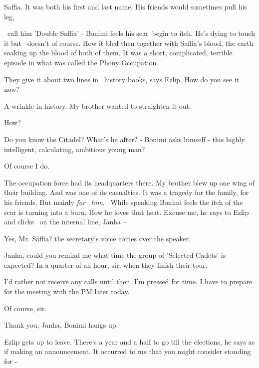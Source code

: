 \documentclass[letterpaper]{article}
\begin{document}
{\textquotedbl}Saffia. It was both his first and last name. His friends would sometimes pull his leg, 

\ call him 'Double Saffia' -{\textquotedbl} Bonimi feels his scar~begin to itch. He's dying to touch it but \ doesn't of
course. How it bled then together with Saffia's blood, the earth soaking up the blood of both of them.
{\textquotedbl}It was a short, complicated, terrible episode in what was called the Phony Occupation.{\textquotedbl} 

{\textquotedbl}They give it about two lines in \ history books,{\textquotedbl} says Ezlip. {\textquotedbl}How do you see
it now?{\textquotedbl} 

{\textquotedbl}A wrinkle in history. My brother wanted to straighten it out.{\textquotedbl} 

{\textquotedbl}How?{\textquotedbl} 

{\textquotedbl}Do you know the Citadel?{\textquotedbl} What's he after? - Bonimi asks himself - this highly intelligent,
calculating, ambitious young man? 

{\textquotedbl}Of course I do.{\textquotedbl} 

{\textquotedbl}The occupation force had its headquarters there. My brother blew up one wing of their building. And was
one of its casualties. It was a tragedy for the family, for his friends. But mainly \textit{for \ him}.{\textquotedbl}
\ While speaking Bonimi feels the itch of the scar is turning into a burn. How he loves that heat.
{\textquotedbl}Excuse me,{\textquotedbl} he says to Ezlip and clicks \ on the internal line, {\textquotedbl}Janha --
{\textquotedbl} 

{\textquotedbl}Yes, Mr. Saffia?{\textquotedbl} the secretary's voice comes over the speaker.

{\textquotedbl}Janha, could you remind me what time the group of 'Selected Cadets'{ }is
expected?{\textquotedbl} {\textquotedbl}In a quarter of an hour, sir, when they finish their tour.{\textquotedbl} 

{\textquotedbl}I'd rather not receive any calls until then. I'm pressed for time. I have to prepare for the meeting with
the PM later today.{\textquotedbl} 

{\textquotedbl}Of course, sir.{\textquotedbl} 

{\textquotedbl}Thank you, Janha,{\textquotedbl} Bonimi hangs up. 

Ezlip gets up to leave. {\textquotedbl}There's a year and a half to go till the elections,{\textquotedbl} he says as if
making an announcement. {\textquotedbl}It occurred to me that you might consider standing for -{\textquotedbl}
\end{document}
